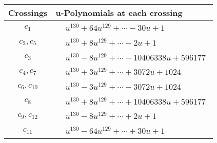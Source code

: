 \documentclass[1p]{elsarticle_modified}
\theoremstyle{definition}
\begin{document}
\begin{tabular}{m{50pt}|m{274pt}}
Crossings & \hspace{64pt}u-Polynomials at each crossing \\
\hline $$\begin{aligned}c_{1}\end{aligned}$$&$\begin{aligned}
&u^{130}+64 u^{129}+\cdots-30 u+1
\end{aligned}$\\
\hline $$\begin{aligned}c_{2},c_{5}\end{aligned}$$&$\begin{aligned}
&u^{130}+8 u^{129}+\cdots-2 u+1
\end{aligned}$\\
\hline $$\begin{aligned}c_{3}\end{aligned}$$&$\begin{aligned}
&u^{130}-8 u^{129}+\cdots-10406338 u+596177
\end{aligned}$\\
\hline $$\begin{aligned}c_{4},c_{7}\end{aligned}$$&$\begin{aligned}
&u^{130}+3 u^{129}+\cdots+3072 u+1024
\end{aligned}$\\
\hline $$\begin{aligned}c_{6},c_{10}\end{aligned}$$&$\begin{aligned}
&u^{130}-3 u^{129}+\cdots-3072 u+1024
\end{aligned}$\\
\hline $$\begin{aligned}c_{8}\end{aligned}$$&$\begin{aligned}
&u^{130}+8 u^{129}+\cdots+10406338 u+596177
\end{aligned}$\\
\hline $$\begin{aligned}c_{9},c_{12}\end{aligned}$$&$\begin{aligned}
&u^{130}-8 u^{129}+\cdots+2 u+1
\end{aligned}$\\
\hline $$\begin{aligned}c_{11}\end{aligned}$$&$\begin{aligned}
&u^{130}-64 u^{129}+\cdots+30 u+1
\end{aligned}$\\
\hline
\end{tabular}\\~\\
\end{document}
